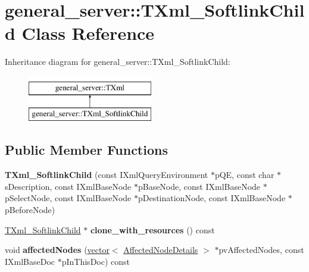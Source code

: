 \hypertarget{classgeneral__server_1_1TXml__SoftlinkChild}{\section{general\-\_\-server\-:\-:\-T\-Xml\-\_\-\-Softlink\-Child \-Class \-Reference}
\label{classgeneral__server_1_1TXml__SoftlinkChild}
}
\-Inheritance diagram for general\-\_\-server\-:\-:\-T\-Xml\-\_\-\-Softlink\-Child\-:\begin{figure}[H]
\begin{center}
\leavevmode
\includegraphics[height=2.000000cm]{classgeneral__server_1_1TXml__SoftlinkChild}
\end{center}
\end{figure}
\subsection*{\-Public \-Member \-Functions}
\begin{DoxyCompactItemize}
\item 
\hypertarget{classgeneral__server_1_1TXml__SoftlinkChild_a6095c6ec7479274d1861918c9430955d}{{\bfseries \-T\-Xml\-\_\-\-Softlink\-Child} (const \-I\-Xml\-Query\-Environment $\ast$p\-Q\-E, const char $\ast$s\-Description, const \-I\-Xml\-Base\-Node $\ast$p\-Base\-Node, const \-I\-Xml\-Base\-Node $\ast$p\-Select\-Node, const \-I\-Xml\-Base\-Node $\ast$p\-Destination\-Node, const \-I\-Xml\-Base\-Node $\ast$p\-Before\-Node)}\label{classgeneral__server_1_1TXml__SoftlinkChild_a6095c6ec7479274d1861918c9430955d}

\item 
\hypertarget{classgeneral__server_1_1TXml__SoftlinkChild_a4e081ad8d4e68aee98cf127c14dc080c}{\hyperlink{classgeneral__server_1_1TXml__SoftlinkChild}{\-T\-Xml\-\_\-\-Softlink\-Child} $\ast$ {\bfseries clone\-\_\-with\-\_\-resources} () const }\label{classgeneral__server_1_1TXml__SoftlinkChild_a4e081ad8d4e68aee98cf127c14dc080c}

\item 
\hypertarget{classgeneral__server_1_1TXml__SoftlinkChild_a52a002bdf38fd01df588c7d697156c20}{void {\bfseries affected\-Nodes} (\hyperlink{classvector}{vector}$<$ \hyperlink{structgeneral__server_1_1TXml_1_1AffectedNodeDetails}{\-Affected\-Node\-Details} $>$ $\ast$pv\-Affected\-Nodes, const \-I\-Xml\-Base\-Doc $\ast$p\-In\-This\-Doc) const }\label{classgeneral__server_1_1TXml__SoftlinkChild_a52a002bdf38fd01df588c7d697156c20}

\end{DoxyCompactItemize}
